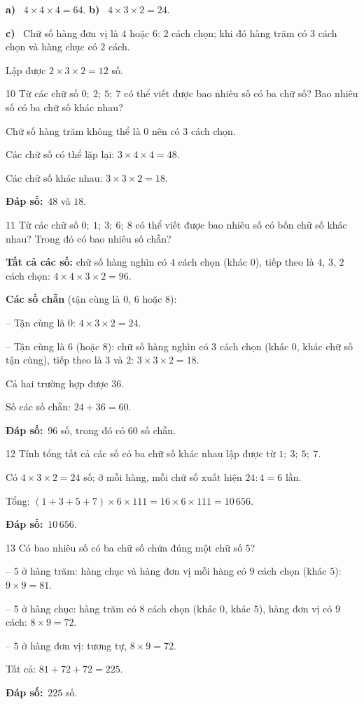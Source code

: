 \documentclass[11pt]{article}
\newif\ifsol \solfalse
\providecommand{\AnsWord}{Đáp số}
\newcommand{\dapso}[1]{\par\textbf{\AnsWord:}\ #1}
\newcommand{\probsol}[1]{%
  \begin{lrbox}{\solmeasure}\begin{minipage}{\dimexpr\linewidth-24pt\relax}#1\end{minipage}\end{lrbox}%
  \ifsol
    \begin{solbox}#1\end{solbox}%
  \else
    \setlength{\solht}{\dimexpr\ht\solmeasure+\dp\solmeasure+0.85cm\relax}%
    \ifdim\solht<1.35cm\setlength{\solht}{1.35cm}\fi
    \begin{tcolorbox}[colback=white,colframe=Line,boxrule=0.8pt,arc=5pt,
      left=8pt,right=8pt,top=4pt,bottom=4pt,height=\solht]{\footnotesize\color{Slate}\itshape\WorkWord}\end{tcolorbox}%
  \fi}
\newcommand{\pa}[1]{\textbf{#1)}\ }
\newcommand{\gap}{\vspace{0.3cm}}
\def\WorkWord{Bài làm:}
\def\AnsWord{Đáp số}
\begin{document}
\probsol{
\pa{a} $4\times4\times4=64$. \qquad \pa{b} $4\times3\times2=24$.\par
\pa{c} Chữ số hàng đơn vị là $4$ hoặc $6$: $2$ cách chọn; khi đó hàng trăm có $3$ cách chọn và hàng chục có $2$ cách.\par Lập được $2\times3\times2=12$ số.
}
\gap
\begin{probbox}{10}{\relax}
Từ các chữ số $0;\ 2;\ 5;\ 7$ có thể viết được bao nhiêu số có ba chữ số? Bao nhiêu số có ba chữ số khác nhau?
\end{probbox}
\probsol{
Chữ số hàng trăm không thể là $0$ nên có $3$ cách chọn.\par
Các chữ số có thể lặp lại: $3\times4\times4=48$.\par Các chữ số khác nhau: $3\times3\times2=18$.
\dapso{$48$ và $18$.}}
\gap
\begin{probbox}{11}{\relax}
Từ các chữ số $0;\ 1;\ 3;\ 6;\ 8$ có thể viết được bao nhiêu số có bốn chữ số khác nhau? Trong đó có bao nhiêu số chẵn?
\end{probbox}
\probsol{
\textbf{Tất cả các số:} chữ số hàng nghìn có $4$ cách chọn (khác $0$), tiếp theo là $4$, $3$, $2$ cách chọn: $4\times4\times3\times2=96$.\par
\textbf{Các số chẵn} (tận cùng là $0$, $6$ hoặc $8$):\par
-- Tận cùng là $0$: $4\times3\times2=24$.\par
-- Tận cùng là $6$ (hoặc $8$): chữ số hàng nghìn có $3$ cách chọn (khác $0$, khác chữ số tận cùng), tiếp theo là $3$ và $2$: $3\times3\times2=18$.\par Cả hai trường hợp được $36$.\par
Số các số chẵn: $24+36=60$.
\dapso{$96$ số, trong đó có $60$ số chẵn.}}
\gap
\begin{probbox}{12}{\relax}
Tính tổng tất cả các số có ba chữ số khác nhau lập được từ $1;\ 3;\ 5;\ 7$.
\end{probbox}
\probsol{
Có $4\times3\times2=24$ số; ở mỗi hàng, mỗi chữ số xuất hiện $24:4=6$ lần.\par
Tổng: $(1+3+5+7)\times6\times111=16\times6\times111=10\,656$.
\dapso{$10\,656$.}}
\gap
\begin{probbox}{13}{\relax}
Có bao nhiêu số có ba chữ số chứa đúng một chữ số $5$?
\end{probbox}
\probsol{
-- $5$ ở hàng trăm: hàng chục và hàng đơn vị mỗi hàng có $9$ cách chọn (khác $5$): $9\times9=81$.\par
-- $5$ ở hàng chục: hàng trăm có $8$ cách chọn (khác $0$, khác $5$), hàng đơn vị có $9$ cách: $8\times9=72$.\par
-- $5$ ở hàng đơn vị: tương tự, $8\times9=72$.\par
Tất cả: $81+72+72=225$.
\dapso{$225$ số.}}
\end{document}
